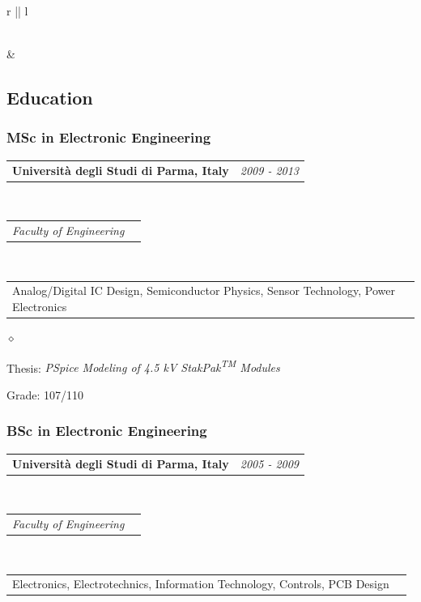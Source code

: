 \documentclass[a4paper]{article}
\makeatletter
\newlength{\sectsep}
\newcommand{\headerrow}[2]
{\begin{tabular*}{\textwidth}{l@{\extracolsep{\fill}}r}
	#1 &
	#2 \\
\end{tabular*}}
\renewenvironment{itemize}{
  \begin{list}{$\diamond$}{
    \setlength{\topsep}{0.25em}
    \setlength{\itemsep}{0em}
    \setlength{\parskip}{0pt}
    \setlength{\parsep}{0em}
  }
}{
  \end{list}
}
\makeatother
\begin{document}
\begin{longtable}{r || l}
\begin{minipage}{0.9\textwidth}
  \end{minipage} \\[\sectsep]

  & \begin{minipage}{0.9\textwidth}
      \vspace{\sectsep}
      \subsection*{Education}
      \subsubsection*{MSc in Electronic Engineering}
      \headerrow
  		{\textbf{Università degli Studi di Parma, Italy}}{\emph{2009 - 2013}}
      \\
      \headerrow
        {\emph{Faculty of Engineering}}{}
      \\
      \headerrow
        {Analog/Digital IC Design, Semiconductor Physics, Sensor Technology, Power Electronics}{}

      \begin{itemize}
          \item Thesis: \emph{PSpice Modeling of 4.5 kV StakPak\textsuperscript{TM} Modules}
          \item Grade: 107/110
      \end{itemize}

      \subsubsection*{BSc in Electronic Engineering}
      \headerrow
  		{\textbf{Università degli Studi di Parma, Italy}}{\emph{2005 - 2009}}
      \\
      \headerrow
        {\emph{Faculty of Engineering}}{}
      \\
      \headerrow
        {Electronics, Electrotechnics, Information Technology, Controls, PCB Design}{}


\end{minipage}
\end{longtable}
\end{document}
